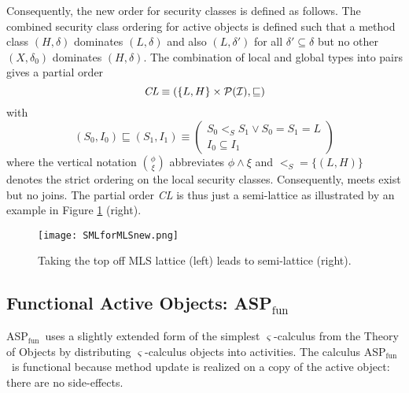 \documentclass[10pt, conference, compsocconf]{IEEEtran}
\newcommand\aspfun{ASP${}_\text{fun}$\ }
\newcommand{\symb}[1]{\makebox{\it #1}}
\begin{document}
Consequently, the new order for security classes is defined as follows.
The combined security class ordering for active objects is defined 
such that a method class $(H, \delta)$ dominates $(L, \delta)$ and also $(L, \delta')$ for all 
$\delta' \subseteq \delta$ 
but no other $(X, \delta_0)$ dominates  $(H, \delta)$. 
The combination of local and global types into pairs gives a partial order 
\[ \symb{CL} \equiv ( \{L,H\} \times \cal{P(I)}, \sqsubseteq ) \]
with 
\[ (S_0, I_0) \sqsubseteq (S_1, I_1) \equiv 
 \left(\begin{array}{c}
     S_0 <_S S_1 \vee S_0 = S_1 = L\\
     I_0 \subseteq I_1 
 \end{array} \right)
\]
where  the vertical notation $\phi \choose \xi$ abbreviates $\phi \wedge \xi$ and
$<_S = \{ (L,H) \}$ denotes the strict ordering on the local security classes.
Consequently, meets exist but no joins. The
partial order {\it CL} is thus just a semi-lattice as illustrated by an example 
in Figure \ref{fig:slmmls} (right).
\begin{figure}
\vspace{-3ex}
\begin{center}
\texttt{[image: SMLforMLSnew.png]}
\end{center}
\vspace{-3ex}
\caption{Taking the top off MLS lattice (left) leads to semi-lattice (right).
\label{fig:slmmls}}
\vspace{-3ex}
\end{figure}


\subsection{Functional Active Objects: \aspfun}
\label{sec:aspfun}
\aspfun uses a slightly extended form of the simplest $\varsigma$-calculus 
from the Theory of Objects \cite{AC96a} by distributing 
$\varsigma$-calculus objects into activities. 
The calculus \aspfun is functional because method update is realized on a copy of the active
object: there are no side-effects.
\end{document}
